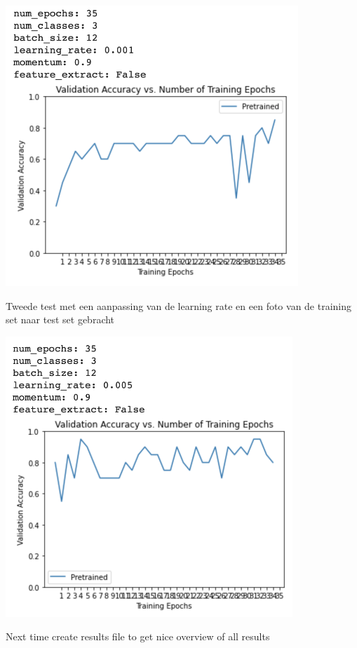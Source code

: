 \documentclass{scrartcl}
\begin{document}
\includegraphics[height=4.166667in, keepaspectratio=true]{./Resnet18/Screenshot 2020-11-18 at 22.58.45.png}

Tweede test met een aanpassing van de learning rate en een foto van de training set naar test set gebracht

\includegraphics[height=4.166667in, keepaspectratio=true]{./Resnet18/Screenshot 2020-11-18 at 23.13.23.png}



Next time create results file to get nice overview of all results
\end{document}
